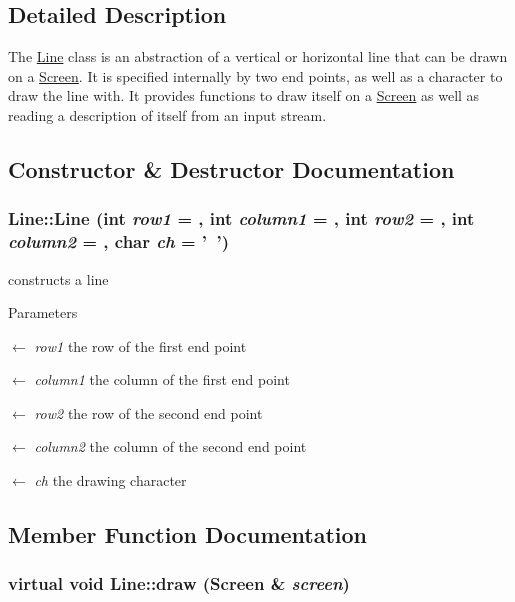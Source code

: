 \subsection{Detailed Description}
The \hyperlink{classLine}{Line} class is an abstraction of a vertical or horizontal line that can be drawn on a \hyperlink{classScreen}{Screen}. It is specified internally by two end points, as well as a character to draw the line with. It provides functions to draw itself on a \hyperlink{classScreen}{Screen} as well as reading a description of itself from an input stream. 

\subsection{Constructor \& Destructor Documentation}
\hypertarget{classLine_a1012aa02dc32f538f8a677748bd5d328}{
\subsubsection[{Line}]{\setlength{\rightskip}{0pt plus 5cm}Line::Line (int {\em row1} = {}, \/  int {\em column1} = {}, \/  int {\em row2} = {}, \/  int {\em column2} = {}, \/  char {\em ch} = {\ttfamily '~'})}}
\label{classLine_a1012aa02dc32f538f8a677748bd5d328}
constructs a line


\begin{DoxyParams}{Parameters}
\item[\mbox{$\leftarrow$} {\em row1}]the row of the first end point \item[\mbox{$\leftarrow$} {\em column1}]the column of the first end point \item[\mbox{$\leftarrow$} {\em row2}]the row of the second end point \item[\mbox{$\leftarrow$} {\em column2}]the column of the second end point \item[\mbox{$\leftarrow$} {\em ch}]the drawing character \end{DoxyParams}


\subsection{Member Function Documentation}
\hypertarget{classLine_a0f119b83f7c23a1bf27b6d34f93b63f2}{
\subsubsection[{draw}]{\setlength{\rightskip}{0pt plus 5cm}virtual void Line::draw ({\bf Screen} \& {\em screen})}}
\label{classLine_a0f119b83f7c23a1bf27b6d34f93b63f2}


